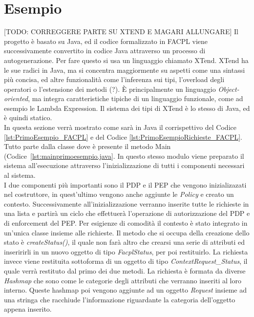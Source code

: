 \section{Esempio} %
\label{sec:esempio}
[TODO: CORREGGERE PARTE SU XTEND E MAGARI ALLUNGARE]
Il progetto è basato su Java, ed il codice formalizzato in FACPL viene successivamente convertito in codice Java attraverso un processo di autogenerazione.
Per fare questo si usa un linguaggio chiamato XTend.
XTend ha le sue radici in Java, ma si concentra maggiormente su aspetti come una sintassi più concisa, ed altre funzionalità come l'inferenza sui tipi, l'overload degli operatori o l'estensione dei metodi (?). 
È principalmente un linguaggio \textit{Object-oriented}, ma integra caratteristiche tipiche di un linguaggio funzionale, come ad esempio le Lambda Expression. Il sistema dei tipi di XTend è lo stesso di Java, ed è quindi statico.\\
In questa sezione verrà mostrato come sarà in Java il corrispettivo del Codice \ref{lst:PrimoEsempio_FACPL} e del Codice \ref{lst:PrimoEsempioRichieste_FACPL}.\\
Tutto parte dalla classe dove è presente il metodo Main (Codice~\ref{lst:mainprimoesempio.java}. In questo stesso modulo viene preparato il sistema all'esecuzione attraverso l'inizializzazione di tutti i componenti necessari al sistema.\\
I due componenti più importanti sono il PDP e il PEP che vengono inizializazati nel costruttore, in quest'ultimo vengono anche aggiunte le \textit{Policy} e creato un contesto. Successivamente all'inizializzazione verranno inserite tutte le richieste in una lista e partirà un ciclo che effettuerà l'operazione di autorizzazione del PDP e di enforcement del PEP.
Per esigienze di comodità il contesto è stato integrato in un'unica classe insieme alle richieste.
Il metodo che si occupa della creazione dello stato è \textit{createStatus()}, il quale non farà altro che crearsi una serie di attributi ed inseririrli in un nuovo oggetto di tipo \textit{FacplStatus}, per poi restituirlo.
La richiesta invece viene restituita sottoforma di un oggetto di tipo \textit{ContextRequest\_Status}, il quale verrà restituto dal primo dei due metodi. La richiesta è formata da diverse \textit{Hashmap} che sono come le categorie degli attributi che verranno inseriti al loro interno.
Queste hashmap poi vengono aggiunte ad un oggetto \textit{Request} insieme ad una stringa che racchiude l'informazione riguardante la categoria dell'oggetto appena inserito.
